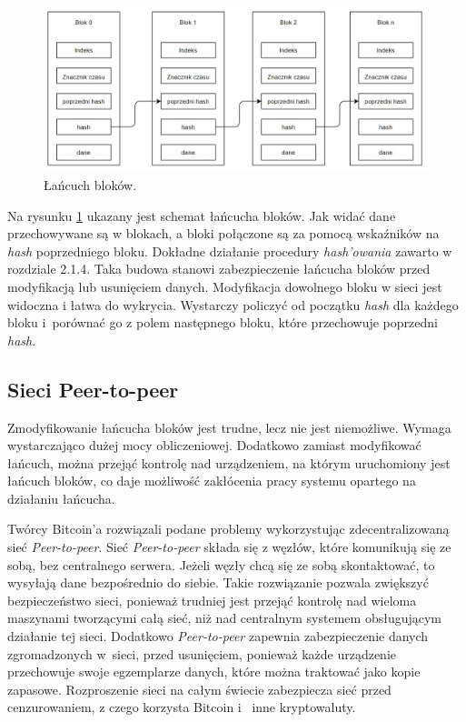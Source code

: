 \documentclass[a4paper,12pt]{book}
\begin{document}
\begin{figure}[h]
	\centering
	\includegraphics[width=\textwidth]{images/łańcuch_bloków.jpg}
	\caption {Łańcuch bloków.}\label{blocksschain}
\end {figure}

Na rysunku \ref{blocksschain} ukazany jest schemat łańcucha bloków. Jak widać dane przechowywane są w blokach, a bloki połączone są za pomocą wskaźników na \textit{hash} poprzedniego bloku. Dokładne działanie procedury \textit{hash'owania} zawarto w rozdziale 2.1.4. Taka budowa stanowi zabezpieczenie łańcucha bloków przed modyfikacją lub usunięciem danych. Modyfikacja dowolnego bloku w sieci jest widoczna i łatwa do wykrycia. Wystarczy policzyć od początku \textit{hash} dla każdego bloku i~porównać go z polem następnego bloku, które przechowuje poprzedni \textit{hash}.

\subsection{Sieci Peer-to-peer}

Zmodyfikowanie łańcucha bloków jest trudne, lecz nie jest niemożliwe. Wymaga wystarczająco dużej mocy obliczeniowej. Dodatkowo zamiast modyfikować łańcuch, można przejąć kontrolę nad urządzeniem, na którym uruchomiony jest łańcuch bloków, co daje możliwość zakłócenia pracy systemu opartego na działaniu łańcucha.

Twórcy Bitcoin'a rozwiązali podane problemy wykorzystując zdecentralizowaną sieć \textit{Peer-to-peer}. Sieć \textit{Peer-to-peer} składa się z węzłów, które komunikują się ze sobą, bez centralnego serwera. Jeżeli węzły chcą się ze sobą skontaktować, to wysyłają dane bezpośrednio do siebie. Takie rozwiązanie pozwala zwiększyć bezpieczeństwo sieci, ponieważ trudniej jest przejąć kontrolę nad wieloma maszynami tworzącymi całą sieć, niż nad centralnym systemem obsługującym działanie tej sieci. Dodatkowo \textit{Peer-to-peer} zapewnia zabezpieczenie danych zgromadzonych w~sieci, przed usunięciem, ponieważ każde urządzenie przechowuje swoje egzemplarze danych, które można traktować jako kopie zapasowe. 
Rozproszenie sieci na całym świecie zabezpiecza sieć przed cenzurowaniem, z czego korzysta Bitcoin i~ inne kryptowaluty.
\end{document}
